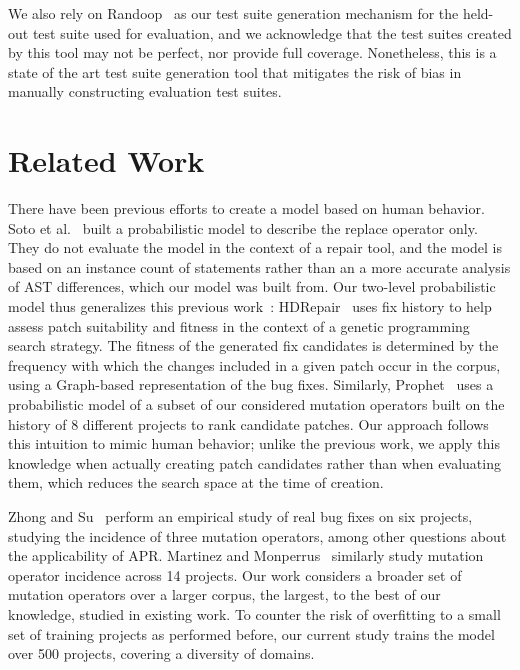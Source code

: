 \documentclass[conference]{IEEEtran}
\begin{document}
We also rely on Randoop~\cite{pacheco07} as our test suite generation mechanism 
for the held-out test suite used for evaluation, and we acknowledge that the 
test suites created by this tool may not be perfect, nor provide full coverage. 
Nonetheless, this is a state of the art test suite generation tool that mitigates the risk of bias in manually constructing evaluation test suites.

\section{Related Work} \label{relatedWork}

There have been previous efforts to create a model based on human behavior.  
Soto et al.~\cite{Soto16} 
built a probabilistic model to describe the replace 
operator only. They do not evaluate the model in the context of a repair
tool, and the model is based on an instance count of statements rather than an a more 
accurate analysis of AST differences, which our model was built from.  
Our two-level probabilistic model thus generalizes this previous work~\cite{Soto16}:
HDRepair~\cite{xuan16} 
uses fix history
to help assess patch suitability and fitness in the context of a genetic
programming search strategy. The fitness of the generated
fix candidates is determined by the frequency with which the changes included in
a given patch occur in the corpus, using a Graph-based representation of the bug
fixes.  Similarly, Prophet~\cite{long16proph} uses a
probabilistic model of a subset of our considered mutation operators built on 
the history of 8 different projects to rank candidate
patches.  Our approach follows this intuition to mimic human
behavior; unlike the previous work, we apply this knowledge when actually
creating patch candidates rather than when evaluating them, which reduces the 
search space at the time of creation.  

Zhong and Su~\cite{zhong15} perform an empirical study of
real bug fixes on six projects, studying the incidence of three mutation
operators, among other questions about the applicability of APR.  Martinez and
Monperrus~\cite{martinez15} similarly study mutation operator incidence across 
14 
projects. Our work considers a broader set of
mutation operators over a larger corpus, the largest, to the best of our
knowledge, studied in existing work. To counter the 
risk of overfitting to a small set of training projects as performed before, our 
current study trains the model over 500 projects, covering a diversity 
of domains.
\end{document}

